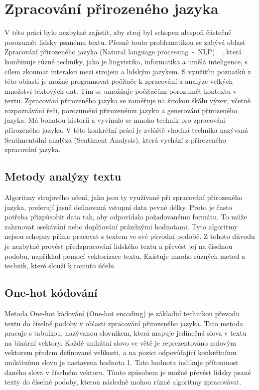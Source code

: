 \chapter{Zpracování přirozeného jazyka}
V této práci bylo nezbytné zajistit, aby stroj byl schopen alespoň částečně porozumět lidsky psanému textu.
Přesně touto problematikou se zabývá oblast Zpracování přirozeného jazyka (Natural language processing~-~NLP)~\cite{link8}~\cite{link9},
 která kombinuje různé techniky, jako je lingvistika, informatika a umělá inteligence, s cílem zkoumat interakci mezi strojem a lidským jazykem.
S využitím poznatků z této oblasti je možné programovat počítače k zpracování a analýze velkých množství textových dat.
Tím se umožňuje počítačům porozumět kontextu v textu.
Zpracování přirozeného jazyka se zaměřuje na širokou škálu výzev, včetně rozpoznávání řeči, porozumění přirozenému jazyku a generování přirozeného jazyka.
Má bohatou historii a vyvinulo se mnoho technik pro zpracování přirozeného jazyka.
V této konkrétní práci je zvláště vhodná technika nazývaná Sentimentální analýza (Sentiment Analysis), která vychází z přirozeného zpracování jazyka.\@

\section{Metody analýzy textu}
Algoritmy strojového učení, jako jsou ty využívané při zpracování přirozeného jazyka, preferují jasně definovaná vstupní data pevné délky.
Proto je často potřeba přizpůsobit data tak, aby odpovídala požadovanému formátu.
To může zahrnovat osekávání nebo doplňování prázdnými hodnotami.
Tyto algoritmy nejsou schopny přímo pracovat s textem ve své původní podobě.
Z tohoto důvodu je nezbytné provést předzpracování lidského textu a převést jej na číselnou podobu, například pomocí vektorizace textu.
Existuje mnoho různých metod a technik, které slouží k tomuto účelu.

\section{One-hot kódování}
Metoda One-hot kódování (One-hot encoding) je základní technikou převodu textu do číselné podoby v oblasti zpracování přirozeného jazyka.\@
Tato metoda pracuje s tabulkou, nazývanou slovníkem, která mapuje jedinečná slova v textu na binární vektory.
Každé unikátní slovo ve větě je reprezentováno nulovým vektorem předem definované velikosti, a na pozici odpovídající konkrétnímu unikátnímu slovu je nastavena hodnota 1.
Tato hodnota indikuje přítomnost daného slova v číselném vektoru. Tímto způsobem je možné převést lidsky psané texty do číselné podoby, kterou následně mohou různé algoritmy zpracovávat.

